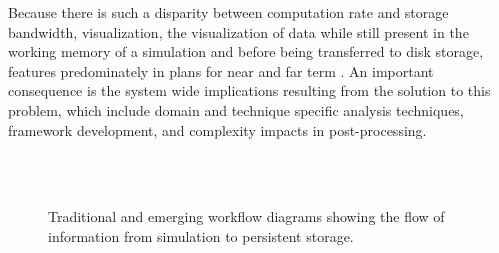 Because there is such a disparity between computation rate and storage
bandwidth, \insitu visualization, the visualization of data while still
present in the working memory of a simulation and before being transferred
to disk storage, features predominately in plans for near and far term
\vda{}.
An important consequence is the system wide implications resulting from the
solution to this problem, which include domain and technique specific
analysis techniques, \insitu framework development, and complexity impacts
in post-processing.

\begin{figure}
  \centering
   \\
   \\
  \caption[Visualization and data analysis workflows.]{Traditional and
    emerging workflow diagrams showing the flow of information from
    simulation to persistent storage.}
  \label{fig:Workflows}
\end{figure}

